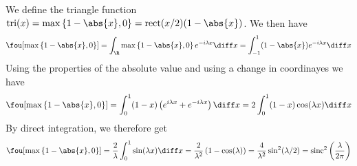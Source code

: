 \documentclass[../mmf.tex]{subfiles}
\begin{document}
\begin{eg}
	We define the triangle function $\mathrm{tri}(x)=\max\left\{ 1-\abs{x},0 \right\}=\mathrm{rect}(x/2)(1-\abs{x})$. We then have
	\begin{equation*}
		\fou[\max\left\{ 1-\abs{x},0 \right\}]=\int_{\R}^{}\max\left\{ 1-\abs{x},0 \right\}e^{-i\lambda x}\diff x=\int_{-1}^{1}(1-\abs{x})e^{-i\lambda x}\diff x
	\end{equation*}
	Using the properties of the absolute value and using a change in coordinayes we have
	\begin{equation*}
		\fou[\max\left\{ 1-\abs{x},0 \right\}]=\int_{0}^{1}(1-x)\left( e^{i\lambda x}+e^{-i\lambda x} \right)\diff x=2\int_{0}^{1}(1-x)\cos(\lambda x)\diff x
	\end{equation*}
	By direct integration, we therefore get
	\begin{equation*}
		\fou[\max\left\{ 1-\abs{x},0 \right\}]=\frac{2}{\lambda}\int_{0}^{1}\sin(\lambda x)\diff x=\frac{2}{\lambda^2}\left( 1-\cos(\lambda) \right)=\frac{4}{\lambda^2}\sin^2(\lambda/2)=\mathrm{sinc}^2\left( \frac{\lambda}{2\pi} \right)
	\end{equation*}
\end{eg}
\end{document}
